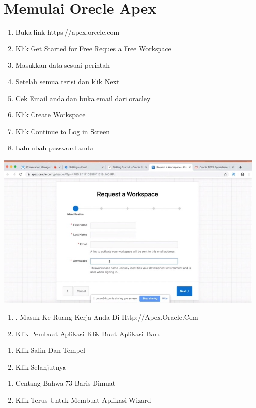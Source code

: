 \documentclass{article}
\begin{document}
\section{Memulai Orecle Apex}
\usepackage{Langkah 1.1:}
\begin{enumerate}
    \item Buka link https://apex.orecle.com
    \item Klik Get Started for Free
    \itemKlik Reques a Free Workspace
    \item Masukkan data sesuai perintah 
    \item Setelah semua terisi dan klik Next
    \item Cek Email anda.dan buka email dari oracley
    \item Klik Create Workspace
    \item Klik Continue to Log in Screen
    \item Lalu ubah password anda\\

\end{enumerate}
\begin{center}
    \includegraphics[width=10cm\textwidth]{figure/request.jpg}
\end{center}
\begin{enumerate}
    \item . Masuk Ke Ruang Kerja Anda Di Http://Apex.Oracle.Com
\item Klik Pembuat Aplikasi Klik Buat Aplikasi Baru
\end{enumerate}
\begin{enumerate}
    \item 	Klik Salin Dan Tempel
    \item Klik Selanjutnya\\
\end{enumerate}

\begin{enumerate}
    \item Centang Bahwa 73 Baris Dimuat
    \item Klik Terus Untuk Membuat Aplikasi Wizard

\end{enumerate}
\end{document}
